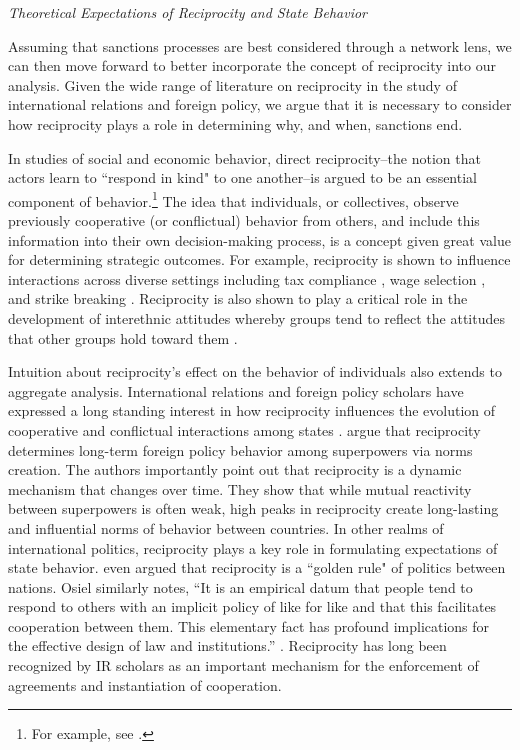 \begin{center}
\textit{Theoretical Expectations of Reciprocity and State Behavior}\\
\end{center}

Assuming that sanctions processes are best considered through a network lens, we can then move forward to better incorporate the concept of reciprocity into our analysis. Given the wide range of literature on reciprocity in the study of international relations and foreign policy, we argue that it is necessary to consider how reciprocity plays a role in determining why, and when, sanctions end.

In studies of social and economic behavior, direct reciprocity--the notion that actors learn to ``respond in kind" to one another--is argued to be an essential component of behavior.\footnote{For example, see \cite{bolton:1998, charness:2002, charness:2004, cox:2007, cox:2004}.} The idea that individuals, or collectives, observe previously cooperative (or conflictual) behavior from others, and include this information into their own decision-making process, is a concept given great value for determining strategic outcomes. For example, reciprocity is shown to influence interactions across diverse settings including tax compliance \citep{smith:1990}, wage selection \citep{campbell:1997}, and strike breaking \citep{brett:1998}. Reciprocity is also shown to play a critical role in the development of interethnic attitudes whereby groups tend to reflect the attitudes that other groups hold toward them \citep{berry:1979}. 

Intuition about reciprocity's effect on the behavior of individuals also extends to aggregate analysis. International relations and foreign policy scholars have expressed a long standing interest in how reciprocity influences the evolution of cooperative and conflictual interactions among states \citep{richardson1960, keohane1989reciprocity}. \cite{rajmaira:1990} argue that reciprocity determines long-term foreign policy behavior among superpowers via norms creation. The authors importantly point out that reciprocity is a dynamic mechanism that changes over time. They show that while mutual reactivity between superpowers is often weak, high peaks in reciprocity create long-lasting and influential norms of behavior between countries. In other realms of international politics, reciprocity plays a key role in formulating expectations of state behavior. \cite{ward1981} even argued that reciprocity is a ``golden rule" of politics between nations.  Osiel similarly notes, ``It is an empirical datum that people tend to respond to others with an implicit policy of like for like and that this facilitates cooperation between them. This elementary fact has profound implications for the effective design of law and institutions.'' \cite[p. 19]{osiel:2009}. Reciprocity has long been recognized by IR scholars as an important mechanism for the enforcement of agreements and instantiation of cooperation. 

